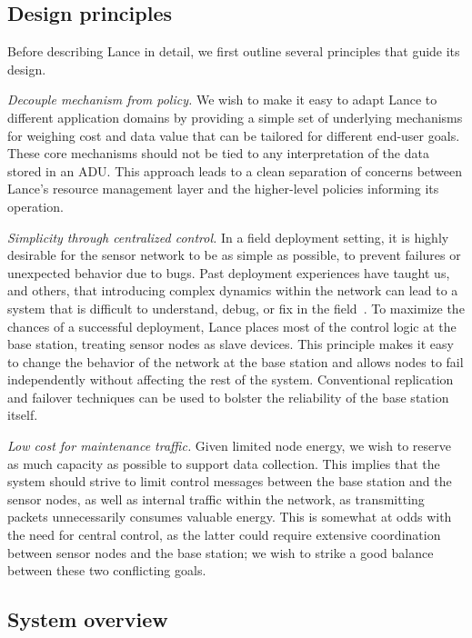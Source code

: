 \documentclass[lettersize]{sig-alternate-konrad}
\begin{document}
\subsection{Design principles}

Before describing Lance in detail, we first outline several principles 
that guide its design. 

{\em Decouple mechanism from policy.}
We wish to make it easy to adapt Lance to different application
domains by providing a simple set of underlying mechanisms for 
weighing cost and data value that can be tailored 
for different
end-user goals. These core mechanisms should not be tied to any
interpretation of the data stored in an ADU. This approach leads 
to a clean separation of concerns between Lance's resource management
layer and the higher-level policies informing its operation.

{\em Simplicity through centralized control.} In a field deployment setting, 
it is highly desirable for the sensor network to be as simple
as possible, to prevent failures or unexpected behavior due to bugs.
Past deployment experiences have taught us, and others, that 
introducing complex dynamics within the network can lead to a system
that is difficult to understand, debug, or fix in the
field~\cite{volcano-osdi06,volcano-ewsn05}.
To maximize the chances of a successful deployment, 
Lance places most of the control
logic at the base station, treating sensor nodes as slave devices.
This principle makes it easy to change the behavior of the network
at the base station and allows nodes to fail independently without 
affecting the rest of the system. Conventional replication and
failover techniques can be used to bolster the reliability of the 
base station itself.

{\em Low cost for maintenance traffic.} Given limited node energy, 
we wish to reserve as much capacity as possible to support
data collection. This implies that the system
should strive to limit control messages between the base station and
the sensor nodes, as well as internal traffic within the network, as
transmitting packets unnecessarily consumes valuable energy.
This is somewhat at odds with the need for central control,
as the latter could require extensive coordination between 
sensor nodes and the base station; we wish to strike a good balance
between these two conflicting goals.

\subsection{System overview}
\end{document}
